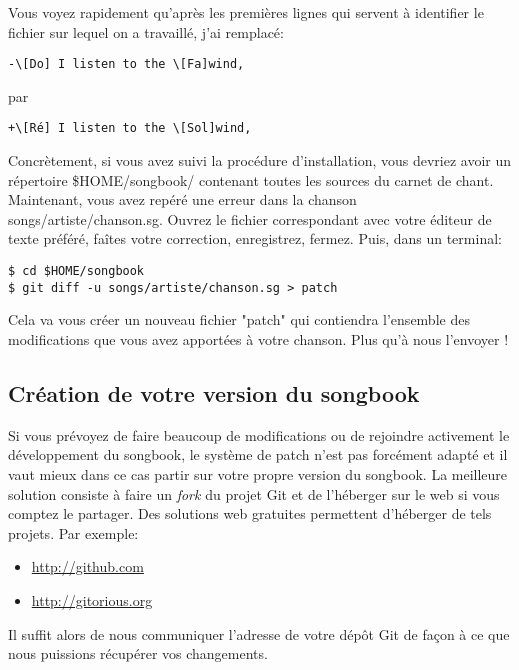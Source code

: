 \documentclass[a4paper]{article}
\begin{document}
Vous voyez rapidement qu'après les premières lignes qui servent à
identifier le fichier sur lequel on a travaillé, j'ai remplacé:
\begin{verbatim}
-\[Do] I listen to the \[Fa]wind,
\end{verbatim}
par
\begin{verbatim}
+\[Ré] I listen to the \[Sol]wind,
\end{verbatim}

Concrètement, si vous avez suivi la procédure d'installation,
vous devriez avoir un répertoire \$HOME/songbook/ contenant toutes les
sources du carnet de chant. Maintenant, vous avez repéré une erreur
dans la chanson songs/artiste/chanson.sg. Ouvrez le fichier
correspondant avec votre éditeur de texte préféré, faîtes votre
correction, enregistrez, fermez. Puis, dans un terminal:

\begin{verbatim}
$ cd $HOME/songbook
$ git diff -u songs/artiste/chanson.sg > patch
\end{verbatim}

Cela va vous créer un nouveau fichier "patch" qui contiendra
l'ensemble des modifications que vous avez apportées à votre
chanson. Plus qu'à nous l'envoyer !

\subsection{Création de votre version du songbook}

Si vous prévoyez de faire beaucoup de modifications ou de rejoindre
activement le développement du songbook, le système de patch n'est pas
forcément adapté et il vaut mieux dans ce cas partir sur votre propre
version du songbook. La meilleure solution consiste à faire un
\emph{fork} du projet Git et de l'héberger sur le web si vous comptez
le partager. Des solutions web gratuites permettent d'héberger de tels
projets. Par exemple:
\begin{itemize}
\item \url{http://github.com}
\item \url{http://gitorious.org}
\end{itemize}

Il suffit alors de nous communiquer l'adresse de votre dépôt Git de
façon à ce que nous puissions récupérer vos changements.
\end{document}

